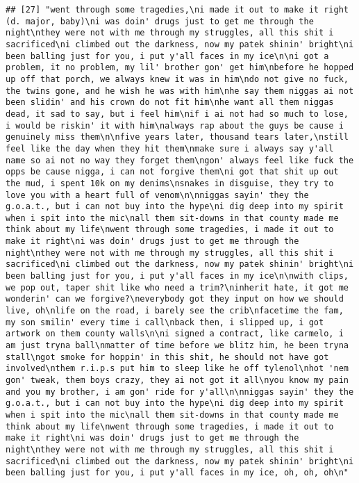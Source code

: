 \documentclass[]{article}
\begin{document}
\begin{verbatim}
## [27] "went through some tragedies,\ni made it out to make it right (d. major, baby)\ni was doin' drugs just to get me through the night\nthey were not with me through my struggles, all this shit i sacrificed\ni climbed out the darkness, now my patek shinin' bright\ni been balling just for you, i put y'all faces in my ice\n\ni got a problem, it no problem, my lil' brother gon' get him\nbefore he hopped up off that porch, we always knew it was in him\ndo not give no fuck, the twins gone, and he wish he was with him\nhe say them niggas ai not been slidin' and his crown do not fit him\nhe want all them niggas dead, it sad to say, but i feel him\nif i ai not had so much to lose, i would be riskin' it with him\nalways rap about the guys be cause i genuinely miss them\n\nfive years later, thousand tears later,\nstill feel like the day when they hit them\nmake sure i always say y'all name so ai not no way they forget them\ngon' always feel like fuck the opps be cause nigga, i can not forgive them\ni got that shit up out the mud, i spent 10k on my denims\nsnakes in disguise, they try to love you with a heart full of venom\n\nniggas sayin' they the g.o.a.t., but i can not buy into the hype\ni dig deep into my spirit when i spit into the mic\nall them sit-downs in that county made me think about my life\nwent through some tragedies, i made it out to make it right\ni was doin' drugs just to get me through the night\nthey were not with me through my struggles, all this shit i sacrificed\ni climbed out the darkness, now my patek shinin' bright\ni been balling just for you, i put y'all faces in my ice\n\nwith clips, we pop out, taper shit like who need a trim?\ninherit hate, it got me wonderin' can we forgive?\neverybody got they input on how we should live, oh\nlife on the road, i barely see the crib\nfacetime the fam, my son smilin' every time i call\nback then, i slipped up, i got artwork on them county walls\n\ni signed a contract, like carmelo, i am just tryna ball\nmatter of time before we blitz him, he been tryna stall\ngot smoke for hoppin' in this shit, he should not have got involved\nthem r.i.p.s put him to sleep like he off tylenol\nhot 'nem gon' tweak, them boys crazy, they ai not got it all\nyou know my pain and you my brother, i am gon' ride for y'all\n\nniggas sayin' they the g.o.a.t., but i can not buy into the hype\ni dig deep into my spirit when i spit into the mic\nall them sit-downs in that county made me think about my life\nwent through some tragedies, i made it out to make it right\ni was doin' drugs just to get me through the night\nthey were not with me through my struggles, all this shit i sacrificed\ni climbed out the darkness, now my patek shinin' bright\ni been balling just for you, i put y'all faces in my ice, oh, oh, oh\n"                                                                                                                                                                                                                                                                                                                                                                                                                                                                                                                                               
\end{verbatim}
\end{document}
